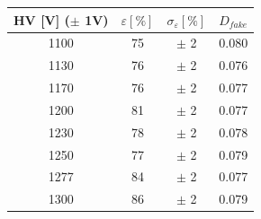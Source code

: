     \begin{tabular}{cccc}
    \toprule
    HV [V] ($\pm$ 1V) & $\varepsilon [\%]$ & $\sigma_{\varepsilon} [\%]$ & $D_{fake}$ \\
    \midrule
    1100 & 75 & $\pm$ 2 & 0.080 \\
    1130 & 76 & $\pm$ 2 & 0.076 \\
    1170 & 76 & $\pm$ 2 & 0.077 \\
    1200 & 81 & $\pm$ 2 & 0.077 \\
    1230 & 78 & $\pm$ 2 & 0.078 \\
    1250 & 77 & $\pm$ 2 & 0.079 \\
    1277 & 84 & $\pm$ 2 & 0.077 \\
    1300 & 86 & $\pm$ 2 & 0.079 \\
    \bottomrule
    \end{tabular}